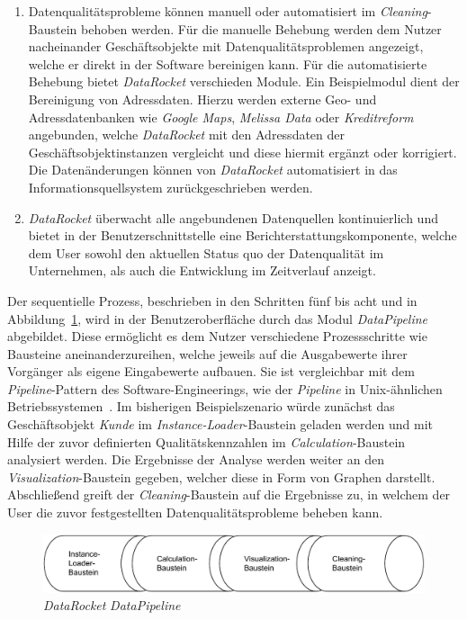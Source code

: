 \documentclass[
  language=german, %
  type=bachelor,%
  ngerman
]{isthesis}
\begin{document}
\begin{content}
\begin{enumerate}
		\item Datenqualitätsprobleme können manuell oder automatisiert im
		\textit{Cleaning}-Baustein behoben werden. Für die manuelle Behebung werden
		dem Nutzer nacheinander Geschäftsobjekte mit Datenqualitätsproblemen
		angezeigt, welche er direkt in der Software bereinigen kann. Für die
		automatisierte Behebung bietet \textit{DataRocket} verschieden Module. Ein
		Beispiel\-modul dient der Bereinigung von Adressdaten. Hierzu werden
		externe Geo- und Adressdatenbanken wie \zB{} \textit{Google Maps},
		\textit{Melissa Data} oder \textit{Kreditreform} angebunden, welche
		\textit{DataRocket} mit den Adressdaten der Geschäftsobjektinstanzen
		vergleicht und diese hiermit \ggf{} ergänzt oder korrigiert. Die
		Datenänderungen können von \textit{DataRocket} automatisiert in das
		Informationsquellsystem zurückgeschrieben werden.

    \item \textit{DataRocket} überwacht alle angebundenen Datenquellen
      kontinuierlich und bietet in der Benutzerschnittstelle eine
      Berichterstattungskomponente, welche dem User sowohl den aktuellen Status
      quo der Datenqualität im Unternehmen, als auch die Entwicklung im
      Zeitverlauf anzeigt.
	\end{enumerate}

	Der sequentielle Prozess, beschrieben in den Schritten fünf bis acht und in Abbildung~\ref{fig:datapipeline}, wird in
	der Benutzeroberfläche durch das Modul \textit{DataPipeline} abgebildet.
	Diese ermöglicht es dem Nutzer verschiedene Prozessschritte wie Bausteine
	aneinanderzureihen, welche jeweils auf die Ausgabewerte ihrer Vorgänger als
	eigene Eingabewerte aufbauen. Sie ist vergleichbar mit dem
	\textit{Pipeline}-Pattern des Software-Engineerings, wie \zB{} der
	\textit{Pipeline} in Unix-ähnlichen
	Betriebssystemen~\cite[][]{spinellis2001notable}. Im bisherigen
	Beispielszenario würde zunächst das Geschäftsobjekt \textit{Kunde} im
	\textit{Instance-Loader}-Baustein geladen werden und mit Hilfe der zuvor
	definierten Qualitätskennzahlen im \textit{Calculation}-Baustein analysiert
	werden. Die Ergebnisse der Analyse werden weiter an den
	\textit{Visualization}-Baustein gegeben, welcher diese in Form von Graphen
	darstellt. Abschließend greift der \textit{Cleaning}-Baustein auf die
	Ergebnisse zu, in welchem der User die zuvor festgestellten
	Datenqualitätsprobleme beheben kann.

  \begin{figure}
    \includegraphics[scale=0.9]{content/figures/datapipeline}
    \caption{\textit{DataRocket} \textit{DataPipeline}}\label{fig:datapipeline}
  \end{figure}



\end{content}
\end{document}
